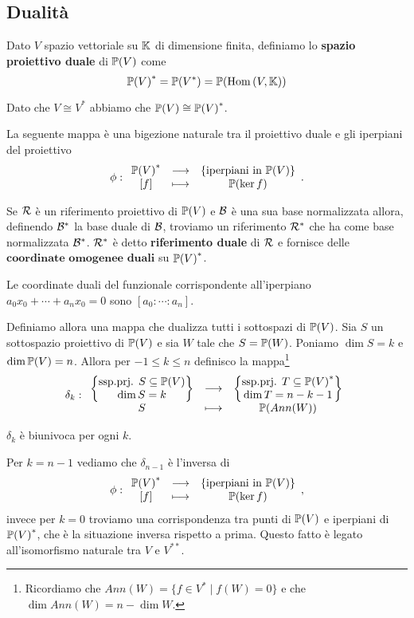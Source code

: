\begin{multicols*}{2}
    \section{Dualit\`a}
    \begin{definition}
    Dato $V$ spazio vettoriale su $\mathbb{K}$ di dimensione finita, definiamo lo \textbf{spazio proiettivo duale} di ${\mathbb{P}(V)}$ come
    \[{\mathbb{P}(V)}^*=\mathbb{P}(V^*)=\mathbb{P}(\mathrm{Hom}\,(V,\mathbb{K}))\]
    \end{definition}
    \begin{remark}
        Dato che $V\cong V^*$ abbiamo che ${\mathbb{P}(V)}\cong {\mathbb{P}(V)}^*$.
    \end{remark}
    \begin{proposition}
    La seguente mappa \`e una bigezione naturale tra il proiettivo duale e gli iperpiani del proiettivo
    \[\phi:\begin{array}{ccc} {{\mathbb{P}(V)}^*} & \longrightarrow & {\{\text{iperpiani in }{\mathbb{P}(V)}\}}\\ {[f]} & \longmapsto & {\mathbb{P}(\ker f)} \end{array}.\]
    \end{proposition}

    \begin{definition}
    Se $\mathcal{R}$ \`e un riferimento proiettivo di ${\mathbb{P}(V)}$ e $\mathcal{B}$ \`e una sua base normalizzata allora, definendo $\mathcal{B}^*$ la base duale di $\mathcal{B}$, troviamo un riferimento $\mathcal{R}^*$ che ha come base normalizzata $\mathcal{B}^*$. $\mathcal{R}^*$ \`e detto \textbf{riferimento duale} di $\mathcal{R}$ e fornisce delle $\textbf{coordinate omogenee duali}$ su ${\mathbb{P}(V)}^*$.
    \end{definition}
    \begin{remark}
    Le coordinate duali del funzionale corrispondente all'iperpiano $a_0x_0+\cdots+a_nx_0=0$ sono $[a_0:\cdots:a_n]$.
    \end{remark}

    \noindent
    Definiamo allora una mappa che dualizza tutti i sottospazi di ${\mathbb{P}(V)}$. Sia $S$ un sottospazio proiettivo di ${\mathbb{P}(V)}$ e sia $W$ tale che $S={\mathbb{P}(W)}$. Poniamo $\dim S=k$ e $\dim {\mathbb{P}(V)}=n$. Allora per $-1\leq k\leq n$ definisco la mappa\footnote{Ricordiamo che $Ann(W)=\{f\in V^\ast\mid f(W)=0\}$ e che $\dim Ann(W)=n-\dim W$.}
    \[\delta_k:\begin{array}{ccc} {\left\{\begin{matrix}
    \text{ssp.prj. }S\subseteq{\mathbb{P}(V)}\\\dim S=k
    \end{matrix}
    \right\}} & \longrightarrow & {\left\{\begin{matrix}
    \text{ssp.prj. }T\subseteq{\mathbb{P}(V)}^*\\\dim T=n-k-1
    \end{matrix}
    \right\}}\\ {S} & \longmapsto & {\mathbb{P}(Ann(W))} \end{array}\]
    \begin{proposition}
    $\delta_k$ \`e biunivoca per ogni $k$.
    \end{proposition}
    \begin{remark}
    Per $k=n-1$ vediamo che $\delta_{n-1}$ \`e l'inversa di
    \[\phi:\begin{array}{ccc} {{\mathbb{P}(V)}^*} & \longrightarrow & {\{\text{iperpiani in }{\mathbb{P}(V)}\}}\\ {[f]} & \longmapsto & {\mathbb{P}(\ker f)} \end{array},\]
    invece per $k=0$ troviamo una corrispondenza tra punti di ${\mathbb{P}(V)}$ e iperpiani di ${\mathbb{P}(V)}^*$, che \`e la situazione inversa rispetto a prima. Questo fatto \`e legato all'isomorfismo naturale tra $V$ e $V^{**}$.
    \end{remark}


\end{multicols*}
